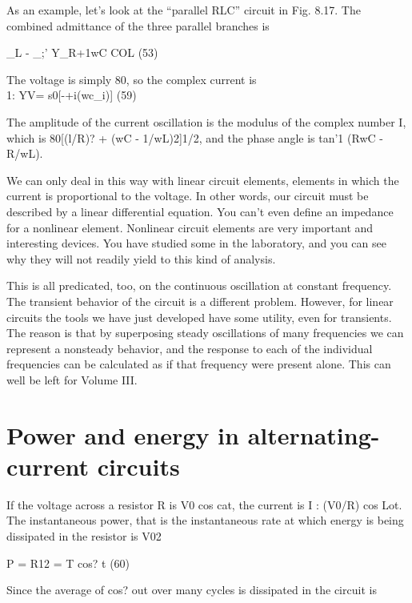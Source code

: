 {As an example, let's look at the ``parallel RLC'' circuit in
Fig. 8.17. The combined admittance of the three parallel branches is

\begin{equation}
\end{equation}
_L - _;'
Y_R+1wC COL (53)

The voltage is simply 80, so the complex current is
\begin{equation}
\end{equation}
1: YV= s0[-+i(wc_i)] (59)

The amplitude of the current oscillation is the modulus of the complex
number I, which is 80[(l/R)? + (wC - 1/wL)2]1/2, and the
phase angle is tan'1 (RwC - R/wL).

We can only deal in this way with linear circuit elements, elements
in which the current is proportional to the voltage. In other words,
our circuit must be described by a linear differential equation. You
can't even define an impedance for a nonlinear element. Nonlinear
circuit elements are very important and interesting devices. You
have studied some in the laboratory, and you can see why they will
not readily yield to this kind of analysis.

This is all predicated, too, on the continuous oscillation at constant
frequency. The transient behavior of the circuit is a different
problem. However, for linear circuits the tools we have just developed
have some utility, even for transients. The reason is that by
superposing steady oscillations of many frequencies we can represent
a nonsteady behavior, and the response to each of the individual
frequencies can be calculated as if that frequency were present alone.
This can well be left for Volume III.

\section{Power and energy in alternating-current circuits}
If the voltage across a resistor R is V0 cos cat, the current is
I : (V0/R) cos Lot. The instantaneous power, that is the instantaneous
rate at which energy is being dissipated in the resistor is
V02

\begin{equation}
\end{equation}
P = R12 = T cos? \omega t (60)

Since the average of cos? out over many cycles is %
dissipated in the circuit is

}
